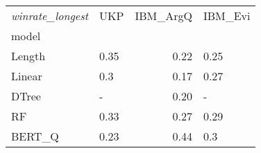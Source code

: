 \begin{tabular}{llrl}
\toprule
\textit{winrate\_longest} &   UKP &  IBM\_ArgQ & IBM\_Evi \\
model  &       &           &         \\
\midrule
Length &  0.35 &      0.22 &    0.25 \\
Linear &   0.3 &      0.17 &    0.27 \\
DTree  &     - &      0.20 &       - \\
RF     &  0.33 &      0.27 &    0.29 \\
BERT\_Q &  0.23 &      0.44 &     0.3 \\
\bottomrule
\end{tabular}
